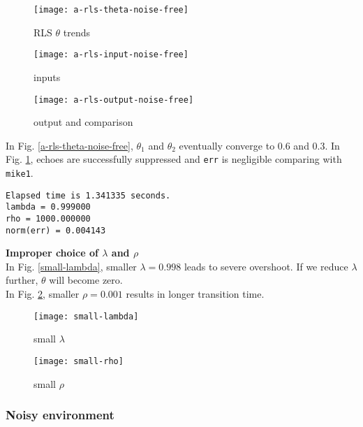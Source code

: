 \documentclass{article}
\begin{document}
\begin{figure}[H]
\begin{minipage}[t]{0.33\linewidth}
\centering
\texttt{[image: a-rls-theta-noise-free]}
\caption{RLS $\theta$ trends}
\label{a-rls-theta-noise-free}
\end{minipage}
\begin{minipage}[t]{0.33\linewidth}
\centering
\texttt{[image: a-rls-input-noise-free]}
\caption{inputs}
\end{minipage}
\begin{minipage}[t]{0.33\linewidth}
\centering
\texttt{[image: a-rls-output-noise-free]}
\caption{output and comparison}
\label{a-rls-output-noise-free}
\end{minipage}
\end{figure}

In Fig. \ref{a-rls-theta-noise-free}, $\theta_1$ and $\theta_2$ eventually converge to 0.6 and 0.3. In Fig. \ref{a-rls-output-noise-free}, echoes are successfully suppressed and \texttt{err} is negligible comparing with \texttt{mike1}.

\begin{lstlisting}[language={}]
Elapsed time is 1.341335 seconds.
lambda = 0.999000
rho = 1000.000000
norm(err) = 0.004143
\end{lstlisting}

\textbf{Improper choice of $\lambda$ and $\rho$}\\

In Fig. \ref{small-lambda}, smaller $\lambda = 0.998$ leads to severe overshoot. If we reduce $\lambda$ further, $\theta$ will become zero.\\

In Fig. \ref{small-rho}, smaller $\rho = 0.001$ results in longer transition time.

\begin{figure}[H]
\begin{minipage}[t]{0.5\linewidth}
\centering
\texttt{[image: small-lambda]}
\caption{small $\lambda$}
\label{small-lambda}
\end{minipage}
\begin{minipage}[t]{0.5\linewidth}
\centering
\texttt{[image: small-rho]}
\caption{small $\rho$}
\label{small-rho}
\end{minipage}
\end{figure}


\subsubsection*{Noisy environment}
\end{document}
